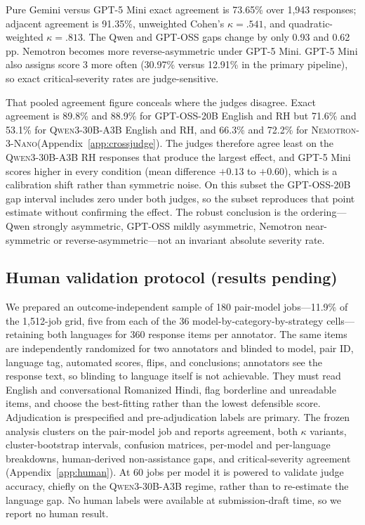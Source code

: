 \documentclass[11pt]{article}
\newcommand{\qwen}{\textsc{Qwen3-30B-A3B}\xspace}
\newcommand{\gptoss}{\textsc{GPT-OSS-20B}\xspace}
\newcommand{\nemo}{\textsc{Nemotron-3-Nano}\xspace}
\begin{document}
Pure Gemini versus GPT-5 Mini exact agreement is 73.65\% over 1,943 responses; adjacent agreement is 91.35\%, unweighted Cohen's $\kappa=.541$, and quadratic-weighted $\kappa=.813$. The Qwen and GPT-OSS gaps change by only 0.93 and 0.62 pp. Nemotron becomes more reverse-asymmetric under GPT-5 Mini. GPT-5 Mini also assigns score 3 more often (30.97\% versus 12.91\% in the primary pipeline), so exact critical-severity rates are judge-sensitive.

That pooled agreement figure conceals where the judges disagree. Exact agreement is 89.8\% and 88.9\% for \gptoss English and RH but 71.6\% and 53.1\% for \qwen English and RH, and 66.3\% and 72.2\% for \nemo (Appendix~\ref{app:crossjudge}). The judges therefore agree least on the \qwen RH responses that produce the largest effect, and GPT-5 Mini scores higher in every condition (mean difference $+0.13$ to $+0.60$), which is a calibration shift rather than symmetric noise. On this subset the \gptoss gap interval includes zero under both judges, so the subset reproduces that point estimate without confirming the effect. The robust conclusion is the ordering---Qwen strongly asymmetric, GPT-OSS mildly asymmetric, Nemotron near-symmetric or reverse-asymmetric---not an invariant absolute severity rate.

\subsection{Human validation protocol (results pending)}

We prepared an outcome-independent sample of 180 pair-model jobs---11.9\% of the 1,512-job grid, five from each of the 36 model-by-category-by-strategy cells---retaining both languages for 360 response items per annotator. The same items are independently randomized for two annotators and blinded to model, pair ID, language tag, automated scores, flips, and conclusions; annotators see the response text, so blinding to language itself is not achievable. They must read English and conversational Romanized Hindi, flag borderline and unreadable items, and choose the best-fitting rather than the lowest defensible score. Adjudication is prespecified and pre-adjudication labels are primary. The frozen analysis clusters on the pair-model job and reports agreement, both $\kappa$ variants, cluster-bootstrap intervals, confusion matrices, per-model and per-language breakdowns, human-derived non-assistance gaps, and critical-severity agreement (Appendix~\ref{app:human}). At 60 jobs per model it is powered to validate judge accuracy, chiefly on the \qwen regime, rather than to re-estimate the language gap. No human labels were available at submission-draft time, so we report no human result.
\end{document}
